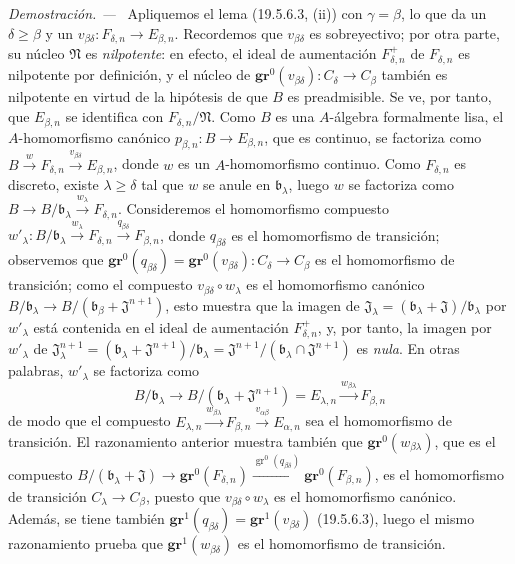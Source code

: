 \documentclass[10pt,oneside]{book}
\newcommand{\gr}{\operatorname{gr}}
\newenvironment{proof}{%
  \par\medskip\noindent\textit{Demostración. ---\ }}{\par}
\begin{document}
\begin{proof}
Apliquemos el lema (19.5.6.3, (ii)) con $\gamma=\beta$, lo que da un
$\delta\geq\beta$ y un
$v_{\beta\delta}:F_{\delta,n}\to E_{\beta,n}$. Recordemos que
$v_{\beta\delta}$ es sobreyectivo; por otra parte, su núcleo $\mathfrak N$ es
\emph{nilpotente}: en efecto, el ideal de aumentación $F_{\delta,n}^+$ de
$F_{\delta,n}$ es nilpotente por definición, y el núcleo de
$\mathbf{gr}^0(v_{\beta\delta}):C_\delta\to C_\beta$ también es nilpotente en virtud de
la hipótesis de que $B$ es preadmisible. Se ve, por tanto, que $E_{\beta,n}$
se identifica con $F_{\delta,n}/\mathfrak N$. Como $B$ es una $A$-álgebra
formalmente lisa, el $A$-homomorfismo canónico
$p_{\beta,n}:B\to E_{\beta,n}$, que es continuo, se factoriza como
$B\xrightarrow{w}F_{\delta,n}\xrightarrow{v_{\beta\delta}}E_{\beta,n}$, donde
$w$ es un $A$-homomorfismo continuo. Como $F_{\delta,n}$ es discreto, existe
$\lambda\geq\delta$ tal que $w$ se anule en $\mathfrak b_\lambda$, luego $w$
se factoriza como
$B\to B/\mathfrak b_\lambda\xrightarrow{w_\lambda}F_{\delta,n}$. Consideremos
el homomorfismo compuesto
$w'_\lambda:B/\mathfrak b_\lambda\xrightarrow{w_\lambda}F_{\delta,n}
\xrightarrow{q_{\beta\delta}}F_{\beta,n}$, donde $q_{\beta\delta}$ es
el homomorfismo de transición; observemos que
$\mathbf{gr}^0(q_{\beta\delta})=\mathbf{gr}^0(v_{\beta\delta}):C_\delta\to C_\beta$ es
el homomorfismo de transición; como el compuesto
$v_{\beta\delta}\circ w_\lambda$ es el homomorfismo
canónico $B/\mathfrak b_\lambda\to
B/(\mathfrak b_\beta+\mathfrak J^{n+1})$, esto muestra que la imagen de
$\mathfrak J_\lambda=(\mathfrak b_\lambda+\mathfrak J)/\mathfrak b_\lambda$
por $w'_\lambda$ está contenida en el ideal de aumentación
$F_{\delta,n}^+$, y, por tanto, la imagen por $w'_\lambda$ de
$\mathfrak J_\lambda^{n+1}=(\mathfrak b_\lambda+\mathfrak J^{n+1})/
\mathfrak b_\lambda=\mathfrak J^{n+1}/(\mathfrak b_\lambda\cap\mathfrak J^{n+1})$ es \emph{nula}. En otras palabras,
$w'_\lambda$ se factoriza como
\[
  B/\mathfrak b_\lambda\to
  B/(\mathfrak b_\lambda+\mathfrak J^{n+1})=E_{\lambda,n}
  \xrightarrow{w_{\beta\lambda}}F_{\beta,n}
\]
de modo que el compuesto
$E_{\lambda,n}\xrightarrow{w_{\beta\lambda}}F_{\beta,n}
\xrightarrow{v_{\alpha\beta}}E_{\alpha,n}$ sea el homomorfismo de transición.
El razonamiento anterior muestra también que $\mathbf{gr}^0(w_{\beta\lambda})$, que es
el compuesto
$B/(\mathfrak b_\lambda+\mathfrak J)\to\mathbf{gr}^0(F_{\delta,n})
\xrightarrow{\gr^0(q_{\beta\delta})}\mathbf{gr}^0(F_{\beta,n})$, es el homomorfismo
de transición $C_\lambda\to C_\beta$, puesto que
$v_{\beta\delta}\circ w_\lambda$ es el homomorfismo canónico. Además, se tiene también
$\mathbf{gr}^1(q_{\beta\delta})=\mathbf{gr}^1(v_{\beta\delta})$ (19.5.6.3), luego el mismo
razonamiento prueba que $\mathbf{gr}^1(w_{\beta\delta})$ es el homomorfismo de
transición.
\end{proof}
\end{document}

